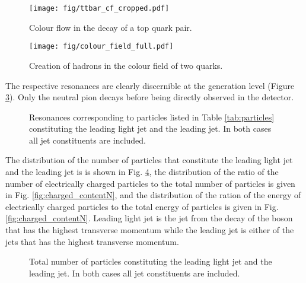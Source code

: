   \begin{figure}[hbtp]

    \centering
    \texttt{[image: fig/ttbar\_cf\_cropped.pdf]}
    \caption{Colour flow in the decay of a top quark pair.}
    \label{fig:ttbar_cf}
    
  \end{figure}

  \begin{figure}[hbtp]
    \centering
    \texttt{[image: fig/colour\_field\_full.pdf]}
    \caption{Creation of hadrons in the colour field of two quarks.}
    \label{fig:colour_field}

  \end{figure}

  The respective resonances are clearly discernible at the generation level (Figure \ref{fig:mass_resonances}). Only the neutral pion decays before being directly observed in the detector.

\begin{figure}[htbp]
        \centering
        \def\twidth{0.45}
\caption{Resonances corresponding to particles listed in Table \protect\ref{tab:particles} constituting the leading light jet and the leading \cPqb jet. In both cases all jet constituents are included.}
\label{fig:mass_resonances}
\end{figure}

  The distribution of the number of particles that constitute the leading light jet and the leading \cPqb jet is is shown in Fig. \ref{fig:number}, the distribution of the ratio of the number of electrically charged particles to the total number of particles is given in Fig. \ref{fig:charged_contentN}, and the distribution of the ration of the energy of electrically charged particles to the total energy of particles is given in Fig. \ref{fig:charged_contentN}. Leading light jet is the jet from the decay of the \PW boson that has the highest transverse momentum \pt while the leading \cPqb jet is either of the \cPqb jets that has the highest transverse momentum.

\begin{figure}[hbtp]
    \centering
        \def\twidth{0.45}
\caption{Total number of particles constituting the leading light jet and the leading \cPqb jet. In both cases all jet constituents are included.}
\label{fig:number}

\end{figure}

